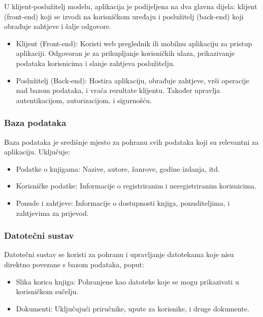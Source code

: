 U klijent-poslužitelj modelu, aplikacija je podijeljena na dva glavna dijela: klijent (front-end) koji se izvodi na korisničkom uređaju i poslužitelj (back-end) koji obrađuje zahtjeve i šalje odgovore.
\begin{itemize}
		  \item {Klijent (Front-end): Koristi web preglednik ili mobilnu aplikaciju za pristup aplikaciji. Odgovoran je za prikupljanje korisničkih ulaza, prikazivanje podataka korisnicima i slanje zahtjeva poslužitelju.}
		  \item {Poslužitelj (Back-end): Hostira aplikaciju, obrađuje zahtjeve, vrši operacije nad bazom podataka, i vraća rezultate klijentu. Također upravlja autentikacijom, autorizacijom, i sigurnošću.}	\\
	   \end{itemize}
	   


 \subsubsection{Baza podataka}

Baza podataka je središnje mjesto za pohranu svih podataka koji su relevantni za aplikaciju. Uključuje:
\begin{itemize}
		  \item {Podatke o knjigama: Nazive, autore, žanrove, godine izdanja, itd.}
		  \item {Korisničke podatke: Informacije o registriranim i neregistriranim korisnicima.}	
            \item {Ponude i zahtjeve: Informacije o dostupnosti knjiga, ponuditeljima, i zahtjevima za prijevod.} \\
	   \end{itemize} 


 \subsubsection{Datotečni sustav}

Datotečni sustav se koristi za pohranu i upravljanje datotekama koje nisu direktno povezane s bazom podataka, poput:
\begin{itemize}
		  \item {Slika korica knjiga: Pohranjene kao datoteke koje se mogu prikazivati u korisničkom sučelju.}
		  \item {Dokumenti: Uključujući priručnike, upute za korisnike, i druge dokumente.} \\
	   \end{itemize} 

